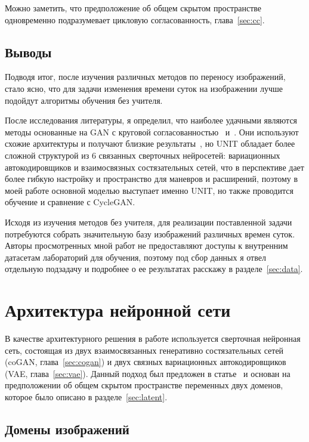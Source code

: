 \documentclass[11pt,a4paper]{extarticle}
\begin{document}
{			\noindent
			Можно заметить, что предположение об общем скрытом пространстве одновременно подразумевает цикловую согласованность, глава~\ref{sec:cc}. 


	\subsection{Выводы}

		Подводя итог, после изучения различных методов по переносу изображений, стало ясно, что для задачи изменения времени суток на изображении лучше подойдут алгоритмы обучения без учителя.

		После исследования литературы, я определил, что наиболее удачными являются методы основанные на GAN с круговой согласованностью~\cite[CycleGAN]{CycleGAN} и~\cite[UNIT]{UNIT}.
		Они используют схожие архитектуры и получают близкие результаты~\cite{UNIT_vs_CycleGAN},
		но UNIT обладает более сложной структурой из 6 связанных сверточных нейросетей: вариационных автокодировщиков и взаимосвязных состязательных сетей,
		что в перспективе дает более гибкую настройку и пространство для маневров и расширений, поэтому в моей работе основной моделью выступает именно UNIT, но также проводится обучение и сравнение с CycleGAN. 

		Исходя из изучения методов без учителя, для реализации поставленной задачи потребуются собрать значительную базу изображений различных времен суток.
		Авторы просмотренных мной работ не предоставляют доступы к внутренним датасетам лабораторий для обучения, поэтому под сбор данных я отвел отдельную подзадачу и подробнее о ее результатах расскажу в разделе~\ref{sec:data}.


\newpage
\section{Архитектура нейронной сети}\label{sec:model}

	В качестве архитектурного решения в работе используется сверточная нейронная сеть, состоящая из двух взаимосвязанных генеративно состязательных сетей (coGAN, глава~\ref{sec:cogan}) и двух связных вариационных автокодировщиков (VAE, глава~\ref{sec:vae}).
	Данный подход был предложен в статье~\cite{UNIT} и основан на предположении об общем скрытом пространстве переменных двух доменов, которое было описано в разделе~\ref{sec:latent}.
	
	\subsection{Домены изображений}\label{sec:model:domains}
		
}
\end{document}
